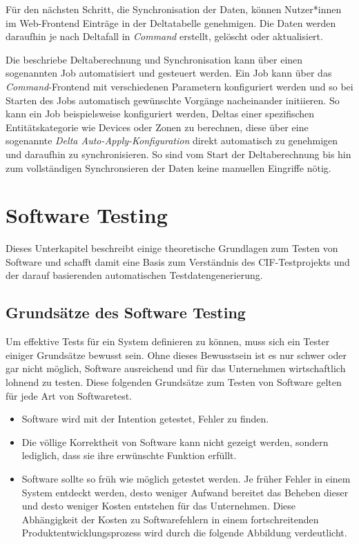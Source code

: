 Für den nächsten Schritt, die Synchronisation der Daten, können Nutzer*innen im Web-Frontend Einträge in der Deltatabelle genehmigen. Die Daten werden daraufhin je nach Deltafall in \textit{Command} erstellt, gelöscht oder aktualisiert.
 
Die beschriebe Deltaberechnung und Synchronisation kann über einen sogenannten Job automatisiert und gesteuert werden. Ein Job kann über das \textit{Command}-Frontend mit verschiedenen Parametern konfiguriert werden und so bei Starten des Jobs automatisch gewünschte Vorgänge nacheinander initiieren. So kann ein Job beispielsweise konfiguriert werden, Deltas einer spezifischen Entitätskategorie wie Devices oder Zonen zu berechnen, diese über eine sogenannte \textit{Delta Auto-Apply-Konfiguration} direkt automatisch zu genehmigen und daraufhin zu synchronisieren. So sind vom Start der Deltaberechnung bis hin zum vollständigen Synchronsieren der Daten keine manuellen Eingriffe nötig.

\section{Software Testing}\label{sec:swtesting}
Dieses Unterkapitel beschreibt einige theoretische Grundlagen zum Testen von Software und schafft damit eine Basis zum Verständnis des \ac{CIF}-Testprojekts und der darauf basierenden automatischen Testdatengenerierung.

\subsection{Grundsätze des Software Testing}\label{subsec:testinginqa}
Um effektive Tests für ein System definieren zu können, muss sich ein Tester einiger Grundsätze bewusst sein. Ohne dieses Bewusstsein ist es nur schwer oder gar nicht möglich, Software ausreichend und für das Unternehmen wirtschaftlich lohnend zu testen. Diese folgenden Grundsätze zum Testen von Software gelten für jede Art von Softwaretest.
\begin{itemize}
    \item Software wird mit der Intention getestet, Fehler zu finden. \cite[S. 6]{myers:2011}\cite[S. 11]{witte:2019}
    \item Die völlige Korrektheit von Software kann nicht gezeigt werden, sondern lediglich, dass sie ihre erwünschte Funktion erfüllt. \cite[S. 19]{ammann:2016}\cite[S. 12]{witte:2019}
    \item Software sollte so früh wie möglich getestet werden. Je früher Fehler in einem System entdeckt werden, desto weniger Aufwand bereitet das Beheben dieser und desto weniger Kosten entstehen für das Unternehmen. \cite[S. 12]{witte:2019} Diese Abhängigkeit der Kosten zu Softwarefehlern in einem fortschreitenden Produktentwicklungsprozess wird durch die folgende Abbildung verdeutlicht.
\end{itemize}

